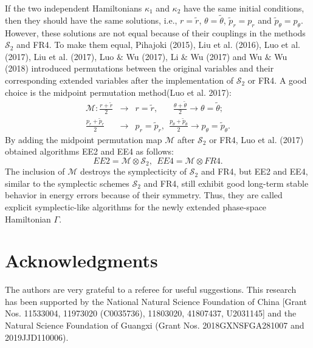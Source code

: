 \documentclass[preprint2]{aastex}
\begin{document}
If the two independent Hamiltonians $\kappa_1$ and $\kappa_2$ have
the same initial conditions, then they should have the same
solutions, i.e., $r=\tilde{r}$, $\theta=\tilde{\theta}$,
$\tilde{p}_r= p_r$ and $\tilde{p}_{\theta}=p_{\theta}$. However,
these solutions are not equal because of their couplings in the
methods $\mathcal{S}_2$ and FR4. To make them equal, Pihajoki
(2015), Liu et al. (2016), Luo et al. (2017), Liu et al. (2017),
Luo $\&$ Wu (2017), Li $\&$ Wu (2017) and Wu $\&$ Wu (2018)
introduced permutations between the original variables and their
corresponding extended variables after the implementation of
$\mathcal{S}_2$ or FR4. A good choice is the midpoint permutation
method(Luo et al. 2017):
\begin{eqnarray}
\mathcal{M}: \frac{r+\tilde{r}}{2} &\rightarrow& r =\tilde{r},
~~~~~~~~ \frac{\theta+\tilde{\theta}}{2}\rightarrow
\theta=\tilde{\theta};
\nonumber \\
\frac{p_r+\tilde{p}_r}{2} &\rightarrow& p_r=\tilde{p}_r, ~~
\frac{p_{\theta}+\tilde{p}_{\theta}}{2}\rightarrow p_{\theta}=
\tilde{p}_{\theta}.
\end{eqnarray}
By adding the midpoint permutation map $\mathcal{M}$ after
$\mathcal{S}_2$ or FR4, Luo et al. (2017) obtained algorithms EE2
and EE4 as follows:
\begin{equation}
EE2= \mathcal{M}\otimes \mathcal{S}_2, ~~ EE4= \mathcal{M}\otimes
FR4.
\end{equation}
The inclusion of   $\mathcal{M}$  destroys the symplecticity of
$\mathcal{S}_2$ and  FR4, but EE2 and EE4, similar to the
symplectic schemes $\mathcal{S}_2$ and FR4, still exhibit good
long-term stable behavior in energy errors because of their
symmetry. Thus, they are called explicit symplectic-like
algorithms for the newly extended phase-space Hamiltonian
$\Gamma$.


\section*{Acknowledgments}

The authors are very grateful to a referee for useful suggestions.
This research has been supported by the National Natural Science
Foundation of China [Grant Nos. 11533004, 11973020 (C0035736),
11803020, 41807437, U2031145]
and the Natural Science Foundation of Guangxi (Grant Nos.
2018GXNSFGA281007 and 2019JJD110006).
\end{document}
